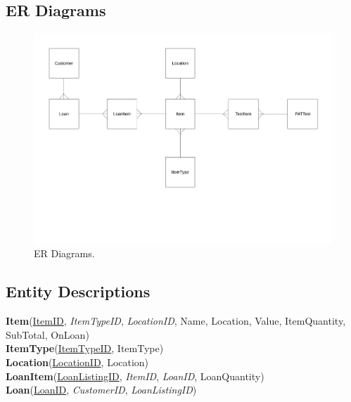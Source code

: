 \begin{landscape}

\subsection{ER Diagrams}

\begin{figure}[H]
    \centerline{\includegraphics[width=600px]{./Design/ER_Diagrams/ER_Diagram.pdf}}
    \caption{ER Diagrams.} \label{fig:ER Diagrams}
\end{figure}

\end{landscape}

\subsection{Entity Descriptions}

\noindent \textbf{Item}(\underline{ItemID}, \emph{ItemTypeID}, \emph{LocationID}, Name, Location, Value, ItemQuantity, SubTotal, OnLoan)\\

\noindent \textbf{ItemType}(\underline{ItemTypeID}, ItemType)\\

\noindent \textbf{Location}(\underline{LocationID}, Location)\\

\noindent \textbf{LoanItem}(\underline{LoanListingID}, \emph{ItemID}, \emph{LoanID}, LoanQuantity)\\

\noindent \textbf{Loan}(\underline{LoanID}, \emph{CustomerID}, \emph{LoanListingID})

